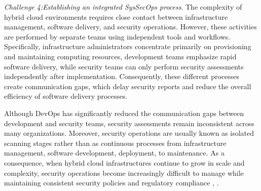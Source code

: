 \vspace{0.3cm}

\textit{Challenge 4:Establishing an integrated SysSecOps process}.
The complexity of hybrid cloud environments requires close contact between infrastructure management, software delivery, and security operations. However, these activities are performed by separate teams using independent tools and workflows. Specifically, infrastructure administrators concentrate primarily on provisioning and maintaining computing resources, development teams emphasize rapid software delivery, while security teams can only perform security assessments independently after implementation. Consequently, these different processes create communication gaps, which delay security reports and reduce the overall efficiency of software delivery processes.

Although DevOps has significantly reduced the communication gaps between development and security teams, security assessments remain inconsistent across many organizations. Moreover, security operations are usually known as isolated scanning stages rather than as continuous processes from infrastructure management, software development, deployment, to maintenance. As a consequence, when hybrid cloud infrastructures continue to grow in scale and complexity, security operations become increasingly difficult to manage while maintaining consistent security policies and regulatory compliance \cite{HashiCorp2025StateCloud}, \cite{Liu2011NISTRA}.